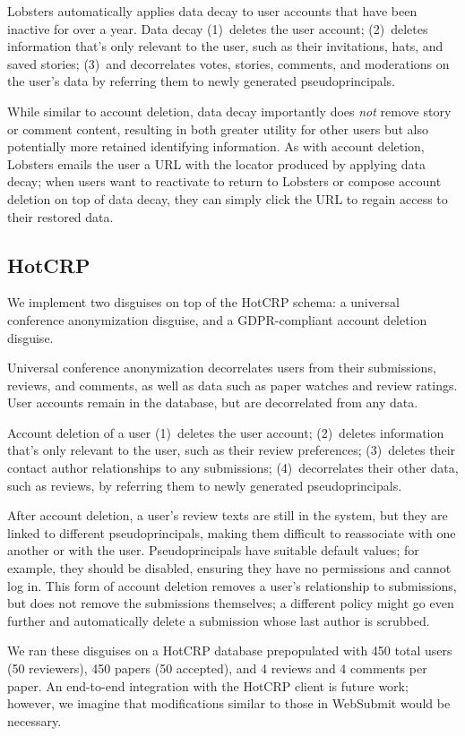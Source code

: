 Lobsters automatically applies data decay to user accounts that have been inactive for over a year.
Data decay 
%
(1)~deletes the user account;
%
(2)~deletes information that's only relevant to the user, such as their invitations, hats, and saved
stories;
%
(3)~and decorrelates votes, stories, comments, and moderations on the user's data by referring them
to newly generated pseudoprincipals.
%

While similar to account deletion, data decay importantly does \emph{not} remove story or comment
content, resulting in both greater utility for other users but also potentially more retained
identifying information.  As with account deletion, Lobsters emails the user a URL with the locator
produced by applying data decay; when users want to reactivate to return to Lobsters or compose
account deletion on top of data decay, they can simply click the URL to regain access to their
restored data.

\subsection{HotCRP}
We implement two disguises on top of the HotCRP schema: a universal conference anonymization disguise, and a
GDPR-compliant account deletion disguise.

Universal conference anonymization decorrelates users from their submissions, reviews, and comments,
as well as data such as paper watches and review ratings. User accounts remain in the database, but
are decorrelated from any data.

 Account deletion of a user 
%
(1)~deletes the user account;
%
(2)~deletes information that's only relevant to the user, such as their review preferences;
%
(3)~deletes their contact author relationships to any submissions;
%
(4)~decorrelates their other data, such as reviews, by referring them to newly generated pseudoprincipals.

After account deletion, a user's review texts are still in the system, but they are linked to
different pseudoprincipals, making them difficult to reassociate with one another or with the user.
%
Pseudoprincipals have suitable default values; for example, they should be disabled, ensuring they
have no permissions and cannot log in.
%
This form of account deletion removes a user's relationship to submissions, but does not remove the
submissions themselves; a different policy might go even further and automatically delete a
submission whose last author is scrubbed.

We ran these disguises on a HotCRP database prepopulated with 450 total users (50 reviewers), 450 papers
(50 accepted), and 4 reviews and 4 comments per paper. 
An end-to-end integration with the HotCRP client is future work; however, we imagine that
modifications similar to those in WebSubmit would be necessary.

